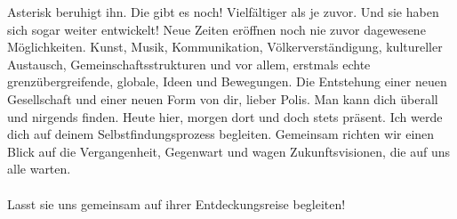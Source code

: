 Asterisk beruhigt ihn. \glqq Die gibt es noch! Vielfältiger als je zuvor. Und sie haben sich sogar weiter entwickelt! Neue Zeiten eröffnen noch nie zuvor dagewesene Möglichkeiten. Kunst, Musik, Kommunikation, Völkerverständigung, kultureller Austausch, Gemeinschaftsstrukturen und vor allem, erstmals echte grenzübergreifende, globale, Ideen und Bewegungen. Die Entstehung einer neuen Gesellschaft und einer neuen Form von dir, lieber Polis. Man kann dich überall und nirgends finden. Heute hier, morgen dort und doch stets präsent. Ich werde dich auf deinem Selbstfindungsprozess begleiten. Gemeinsam richten wir einen Blick auf die Vergangenheit, Gegenwart und wagen Zukunftsvisionen, die auf uns alle warten.\grqq
\\
\\
Lasst sie uns gemeinsam auf ihrer Entdeckungsreise begleiten!

